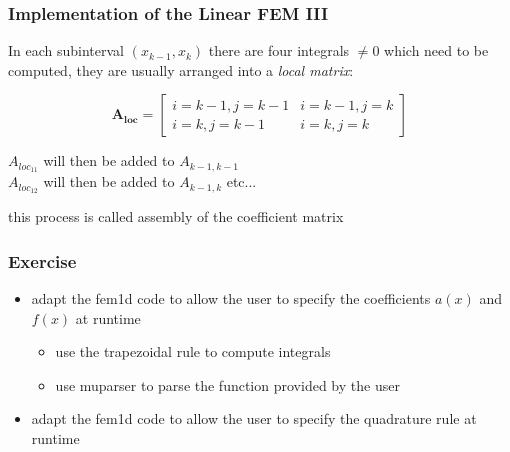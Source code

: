 \documentclass[smaller,a4paper]{beamer}
\newcommand{\Myfoilheadskip}[1]{\begin{frame}\frametitle{#1}}
\newcommand{\mtrx}[1]{\mathbf{#1}}
\begin{document}
\Myfoilheadskip{Implementation of the Linear FEM III}%

In each subinterval $(x_{k-1},x_{k})$ there are four integrals $\neq 0$ which 
need to be computed, they are usually arranged into a \emph{local matrix}:

$$
\mtrx{A_{loc}}=
\left[\begin{array}{cc}
i=k-1,j=k-1 & i=k-1,j=k \\[.1cm]
i=k,j=k-1 & i=k,j=k 
\end{array}\right]
$$

\null

\noindent 
$A_{loc_{11}}$ will then be added to $A_{k-1,k-1}$  \\
$A_{loc_{12}}$ will then be added to $A_{k-1,k}$ etc...

\null

this process is called assembly of the coefficient matrix

\end{frame}

\begin{frame}\frametitle{Exercise}
\begin{itemize}
\item adapt the fem1d code to allow the user to specify the coefficients $a(x)$ and $f(x)$ at runtime
\begin{itemize}
\item use the trapezoidal rule to compute integrals
\item use muparser to parse the function provided by the user
\end{itemize}
\item adapt the fem1d code to allow the user to specify the quadrature rule at runtime
\end{itemize}
\end{frame}
\end{document}
